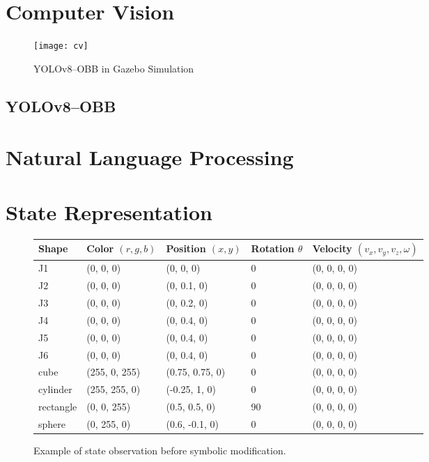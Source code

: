 \section{Computer Vision}
\begin{figure}[htb]
  \centering
  \texttt{[image: cv]}
  \caption{YOLOv8--OBB in Gazebo Simulation}
  \label{fig:cv}
\end{figure}

\subsection{YOLOv8--OBB}
\section{Natural Language Processing}
\section{State Representation}

\begin{figure}
	\begin{tiny}
		\begin{center}
			\begin{tabular}{ | m{2cm} | m{2cm}| m{2cm} | m{2cm} | m{3.25cm} |  }
				\hline
				\textbf{Shape} & \textbf{Color $(r, g, b)$} & \textbf{Position $(x,y)$} & \textbf{Rotation $\theta$} & \textbf{Velocity $(v_x, v_y, v_z, \omega)$} \\
				\hline
				J1 & (0, 0, 0) & (0, 0, 0) & 0\textdegree & (0, 0, 0, 0) \\ 
				\hline
				J2 & (0, 0, 0) & (0, 0.1, 0) & 0\textdegree & (0, 0, 0, 0) \\ 
				\hline
				J3 & (0, 0, 0) & (0, 0.2, 0) & 0\textdegree & (0, 0, 0, 0) \\ 
				\hline
				J4 & (0, 0, 0) & (0, 0.4, 0) & 0\textdegree & (0, 0, 0, 0) \\ 
				\hline
				J5 & (0, 0, 0) & (0, 0.4, 0) & 0\textdegree & (0, 0, 0, 0) \\ 
				\hline
				J6 & (0, 0, 0) & (0, 0.4, 0) & 0\textdegree & (0, 0, 0, 0) \\ 
				\hline
				cube & (255, 0, 255) & (0.75, 0.75, 0) & 0\textdegree & (0, 0, 0, 0) \\ 
				\hline
				cylinder & (255, 255, 0) & (-0.25, 1, 0) & 0\textdegree & (0, 0, 0, 0) \\ 
				\hline
				rectangle & (0, 0, 255) & (0.5, 0.5, 0) & 90\textdegree & (0, 0, 0, 0) \\ 
				\hline
				sphere & (0, 255, 0) & (0.6, -0.1, 0) & 0\textdegree & (0, 0, 0, 0) \\ 
				\hline
			\end{tabular}
		\end{center}
	\end{tiny}
	\caption{Example of state observation before symbolic modification.}
	\label{fig:default_state}
\end{figure}



